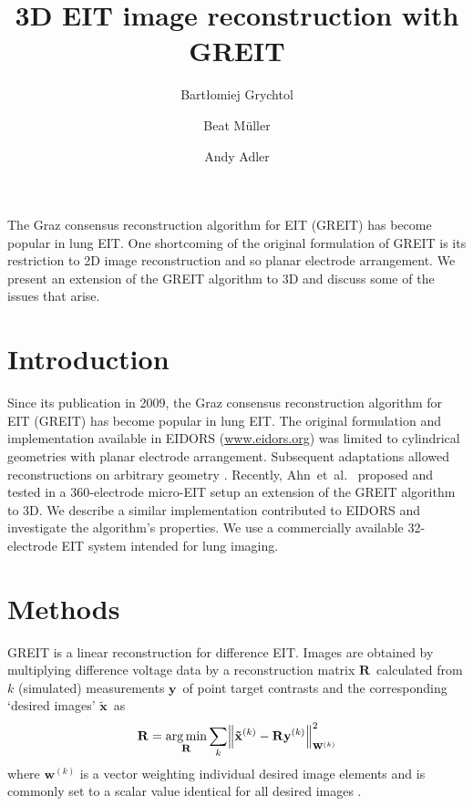 \documentclass[10pt,a4paper]{article}
\title{3D EIT image reconstruction with GREIT%
\vspace{-2ex}} %
\author[1]{Bart\l{}omiej Grychtol}
\author[2]{Beat M\"uller}
\author[3]{Andy Adler}
\affil[1]{Fraunhofer Project Group for Automation in Medicine and 
Biotechnology, Mannheim, Germany \protect\url{b.grychtol@ipa.fraunhofer.de}}
\affil[2]{Swisstom AG, Landquart, Switzerland}
\affil[3]{Systems and Computer Engineering, Carleton University, Ottawa, Canada}
\date{}
\newcommand{\xT}{\mbox{$\mathbf{\tilde x}$}}
\newcommand{\XT}{\mbox{$\mathbf{\tilde X}$}}
\newcommand{\yB}{\mbox{$\mathbf{y}$}}
\newcommand{\wB}{\mbox{$\mathbf{w}$}}
\newcommand{\RB}{\mbox{$\mathbf{R}$}}
\newcommand{\JB}{\mbox{$\mathbf{J}$}}
\newcommand{\YB}{\mbox{$\mathbf{Y}$}}
\newcommand{\SG}{\mbox{$\boldsymbol{\Sigma}$}}
\begin{document}
\newcommand{\argmin}{\operatornamewithlimits{arg\,min}}
\DeclarePairedDelimiter\norm{\lVert}{\rVert}%
\maketitle
\vspace{-1.5cm}
\thispagestyle{empty}

\begin{multicols}{2}

 The Graz consensus reconstruction algorithm for EIT 
(GREIT) has become popular in lung EIT. One shortcoming of the original 
formulation of GREIT is its restriction to 2D image reconstruction and so 
planar electrode arrangement. We present an extension of the GREIT algorithm to 
3D and discuss some of the issues that arise.

\section{Introduction}
Since its publication in 2009, the Graz consensus reconstruction algorithm for 
EIT (GREIT) \cite{Adler2009b} has become popular in lung EIT. The original 
formulation and implementation available in EIDORS (\url{www.eidors.org}) was 
limited to cylindrical geometries with planar electrode arrangement. Subsequent 
adaptations allowed reconstructions on arbitrary geometry \cite{Grychtol2011}. 
Recently, Ahn~et~al.~\cite{Ahn2014a} proposed and tested in a 
360-electrode micro-EIT setup an extension of the GREIT algorithm to 3D.
We describe a similar implementation contributed to EIDORS and 
investigate the algorithm's properties. We use a commercially available 
32-electrode EIT system intended for lung imaging.


\section{Methods} 
GREIT is a linear reconstruction for difference EIT. Images are obtained by 
multiplying difference voltage data by a reconstruction matrix \RB\ calculated 
from $k$ (simulated) measurements \yB\ of point target contrasts and the 
corresponding `desired images' \xT\ as
\begin{equation}
\RB = \argmin_{\footnotesize\RB}\sum_k \norm*{\xT^{(k)} - 
\RB\yB^{(k)}}^2_{\wB^{(k)}}
\end{equation}
where $\wB^{(k)}$ is a vector weighting individual desired image elements and 
is commonly set to a scalar value identical for all desired images 
\citep[eq. 13]{Adler2009b}.



\end{multicols}
\end{document}
